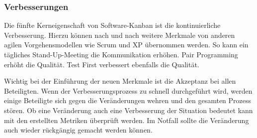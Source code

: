 \subsubsection{Verbesserungen}
Die fünfte Kerneigenschaft von Software-Kanban ist die kontinuierliche Verbesserung. Hierzu können nach und nach weitere Merkmale von anderen agilen Vorgehensmodellen wie Scrum und XP übernommen werden. So kann ein tägliches Stand-Up-Meeting die Kommunikation erhöhen. Pair Programming erhöht die Qualität. Test First verbessert ebenfalls die Qualität. 

Wichtig bei der Einführung der neuen Merkmale ist die Akzeptanz bei allen Beteiligten. Wenn der Verbesserungsprozess zu schnell durchgeführt wird, werden einige Beteiligte sich gegen die Veränderungen wehren und den gesamten Prozess stören. Ob eine Veränderung auch eine Verbesserung der Situation bedeutet kann mit den erstellten Metriken überprüft werden. Im Notfall sollte die Veränderung auch wieder rückgängig gemacht werden können.